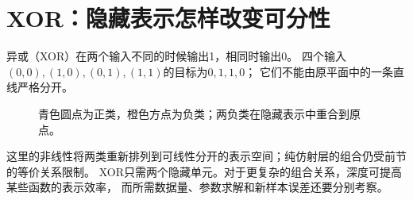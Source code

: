 \section{XOR：隐藏表示怎样改变可分性}
\label{sec:nn-xor}
异或（XOR）在两个输入不同的时候输出1，相同时输出0。
四个输入$(0,0),(1,0),(0,1),(1,1)$的目标为$0,1,1,0$；
它们不能由原平面中的一条直线严格分开。

\begin{figure}[htbp]
\centering
\caption{青色圆点为正类，橙色方点为负类；两负类在隐藏表示中重合到原点。}
\par\smallskip
{}
\end{figure}

这里的非线性将两类重新排列到可线性分开的表示空间；纯仿射层的组合仍受前节的等价关系限制。
XOR只需两个隐藏单元。对于更复杂的组合关系，深度可提高某些函数的表示效率，
而所需数据量、参数求解和新样本误差还要分别考察。


